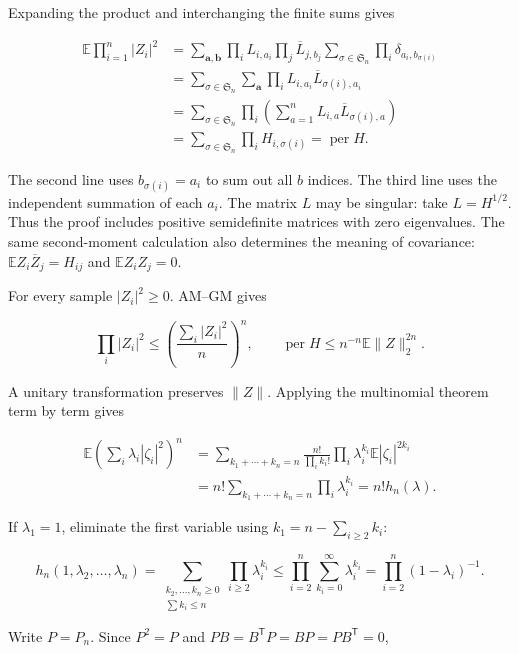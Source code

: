 \documentclass[11pt,a4paper]{article}
\begin{document}
Expanding the product and interchanging the finite sums gives

\[
\begin{aligned}
\mathbb E\prod_{i=1}^n|Z_i|^2
&=\sum_{\boldsymbol a,\boldsymbol b}
\prod_iL_{i,a_i}\prod_j\overline L_{j,b_j}
\sum_{\sigma\in \mathfrak S_n}\prod_i\delta_{a_i,b_{\sigma(i)}}\\
&=\sum_{\sigma\in \mathfrak S_n}\sum_{\boldsymbol a}
\prod_i L_{i,a_i}\overline L_{\sigma(i),a_i}\\
&=\sum_{\sigma\in \mathfrak S_n}\prod_i
\left(\sum_{a=1}^nL_{i,a}\overline L_{\sigma(i),a}\right)\\
&=\sum_{\sigma\in \mathfrak S_n}\prod_iH_{i,\sigma(i)}
=\operatorname{per}H.
\end{aligned}
\]

The second line uses \(b_{\sigma(i)}=a_i\) to sum out all \(b\) indices. The third line uses the independent summation of each \(a_i\). The matrix \(L\) may be singular: take \(L=H^{1/2}\). Thus the proof includes positive semidefinite matrices with zero eigenvalues. The same second-moment calculation also determines the meaning of covariance: \(\mathbb EZ_i\overline Z_j=H_{ij}\) and \(\mathbb EZ_iZ_j=0\).

For every sample \(|Z_i|^2\ge0\). AM--GM gives

\[
\prod_i|Z_i|^2\le\left(\frac{\sum_i|Z_i|^2}{n}\right)^n,
\qquad \operatorname{per}H\le n^{-n}\mathbb E\|Z\|_2^{2n}.
\]

A unitary transformation preserves \(\|Z\|\). Applying the multinomial theorem term by term gives

\[
\begin{aligned}
\mathbb E\left(\sum_i\lambda_i|\zeta_i|^2\right)^n
&=\sum_{k_1+\cdots+k_n=n}\frac{n!}{\prod_i k_i!}
\prod_i\lambda_i^{k_i}\mathbb E|\zeta_i|^{2k_i}\\
&=n!\sum_{k_1+\cdots+k_n=n}\prod_i\lambda_i^{k_i}
=n!h_n(\lambda).
\end{aligned}
\]

If \(\lambda_1=1\), eliminate the first variable using \(k_1=n-\sum_{i\ge2}k_i\):

\[
h_n(1,\lambda_2,\ldots,\lambda_n)
=\sum_{\substack{k_2,\ldots,k_n\ge0\\\sum k_i\le n}}\prod_{i\ge2}\lambda_i^{k_i}
\le\prod_{i=2}^n\sum_{k_i=0}^{\infty}\lambda_i^{k_i}
=\prod_{i=2}^n(1-\lambda_i)^{-1}.
\]

Write \(P=P_n\). Since \(P^2=P\) and \(PB=B^{\mathsf T}P=BP=PB^{\mathsf T}=0\),
\end{document}
